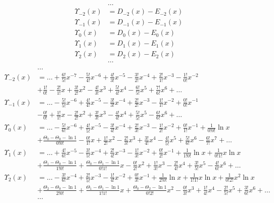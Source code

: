\begin{equation*} \begin{aligned}
&\ldots \\
\Upsilon_{-2}(x) &= D_{-2}(x) - E_{-2}(x) \\
\Upsilon_{-1}(x) &= D_{-1}(x) - E_{-1}(x) \\
\Upsilon_0(x) &= D_0(x) - E_0(x) \\
\Upsilon_1(x) &= D_1(x) - E_1(x) \\
\Upsilon_2(x) &= D_2(x) - E_2(x) \\
&\ldots \\
\end{aligned} \end{equation*}
%
\begin{equation*} \begin{aligned}
&\ldots \\
%
\Upsilon_{-2}(x) &=
  \ldots
+ \frac{6!}{5!} x^{-7}
- \frac{5!}{4!} x^{-6}
+ \frac{4!}{3!} x^{-5}
- \frac{3!}{2!} x^{-4}
+ \frac{2!}{1!} x^{-3}
- \frac{1!}{0!} x^{-2} \\ &
+ \frac{1!}{0!}
- \frac{2!}{1!} x
+ \frac{3!}{2!} x^2
- \frac{4!}{3!} x^3
+ \frac{5!}{4!} x^4
- \frac{6!}{5!} x^5
+ \frac{7!}{6!} x^6
+ \ldots \\
%
\Upsilon_{-1}(x) &=   
  \ldots
- \frac{5!}{5!} x^{-6}
+ \frac{4!}{4!} x^{-5}
- \frac{3!}{3!} x^{-4}
+ \frac{2!}{2!} x^{-3}
- \frac{1!}{1!} x^{-2}
+ \frac{0!}{0!} x^{-1} \\ &
- \frac{0!}{0!}
+ \frac{1!}{1!} x
- \frac{2!}{2!} x^2
+ \frac{3!}{3!} x^3
- \frac{4!}{4!} x^4
+ \frac{5!}{5!} x^5
- \frac{6!}{6!} x^6
+ \ldots \\
%
\Upsilon_0(x) &=   
  \ldots
- \frac{5!}{6!} x^{-6}
+ \frac{4!}{5!} x^{-5}
- \frac{3!}{4!} x^{-4}
+ \frac{2!}{3!} x^{-3}
- \frac{1!}{2!} x^{-2}
+ \frac{0!}{1!} x^{-1}
+ \frac{1}{0!0!} \ln{x} \\ &
+ \frac{\Theta_0 - \Theta_0 - \ln{1}}{0!0!}
- \frac{0!}{1!} x 
+ \frac{1!}{2!} x^2
- \frac{2!}{3!} x^3
+ \frac{3!}{4!} x^4
- \frac{4!}{5!} x^5
+ \frac{5!}{6!} x^6
- \frac{6!}{7!} x^7
+ \ldots \\
%
\Upsilon_1(x) &=   
  \ldots
+ \frac{4!}{6!} x^{-5}
- \frac{3!}{5!} x^{-4}
+ \frac{2!}{4!} x^{-3}
- \frac{1!}{3!} x^{-2}
+ \frac{0!}{2!} x^{-1}
+ \frac{1}{1!0!} \ln{x}
+ \frac{1}{0!1!} x \ln{x} \\ &
+ \frac{\Theta_1 - \Theta_0 - \ln{1}}{1!0!}
+ \frac{\Theta_0 - \Theta_1 - \ln{1}}{0!1!} x
- \frac{0!}{2!} x^2
+ \frac{1!}{3!} x^3
- \frac{2!}{4!} x^4
+ \frac{3!}{5!} x^5
- \frac{4!}{6!} x^6
+ \ldots \\
%
\Upsilon_2(x) &=   
  \ldots
- \frac{3!}{6!} x^{-4}
+ \frac{2!}{5!} x^{-3}
- \frac{1!}{4!} x^{-2}
+ \frac{0!}{3!} x^{-1}
+ \frac{1}{2!0!} \ln{x}
+ \frac{1}{1!1!} x \ln{x}
+ \frac{1}{0!2!} x^2 \ln{x} \\ &
+ \frac{\Theta_2 - \Theta_0 - \ln{1}}{2!0!}
+ \frac{\Theta_1 - \Theta_1 - \ln{1}}{1!1!} x
+ \frac{\Theta_0 - \Theta_2 - \ln{1}}{0!2!} x^2
- \frac{0!}{3!} x^3
+ \frac{1!}{4!} x^4
- \frac{2!}{5!} x^5
+ \frac{3!}{6!} x^6
+ \ldots \\
%
&\ldots \\
\end{aligned} \end{equation*}
